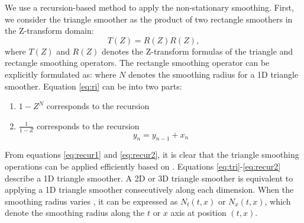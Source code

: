 We use a recursion-based method to apply the non-stationary smoothing. First, we consider the triangle smoother as the product of two rectangle smoothers in the Z-transform domain:
\begin{equation}
\label{eq:tri}
T(Z)=R(Z)R(Z),
\end{equation}
where $T(Z)$ and $R(Z)$ denotes the Z-transform formulas of the triangle and rectangle smoothing operators. The rectangle smoothing operator can be explicitly formulated as:
where $N$ denotes the smoothing radius for a 1D triangle smoother. Equation \ref{eq:ri} can be  into two parts: 
\begin{enumerate}
\item $1-Z^N$ corresponds to the recursion 
\item $\frac{1}{1-Z}$ corresponds to the recursion 
\begin{equation}
\label{eq:recur2}
y_n=y_{n-1}+x_n
\end{equation}
\end{enumerate}
From equations \ref{eq:recur1} and \ref{eq:recur2}, it is clear that the triangle smoothing operations can be applied efficiently based on . Equations \ref{eq:tri}-\ref{eq:recur2} describe a 1D triangle smoother. A 2D or 3D triangle smoother is equivalent to applying a 1D triangle smoother consecutively along each dimension. When the smoothing radius varies , it can be expressed as $N_t(t,x)$ or $N_x(t,x)$, which denote the smoothing radius along the $t$ or $x$ axis at position $(t,x)$. 

